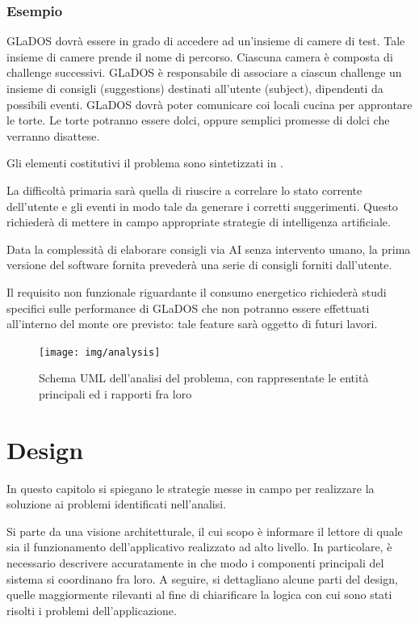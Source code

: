 \documentclass[a4paper,12pt]{report}
\begin{document}
\subsection*{Esempio}
GLaDOS dovrà essere in grado di accedere ad un'insieme di camere di test.
%
Tale insieme di camere prende il nome di percorso.
%
Ciascuna camera è composta di challenge successivi.
%
GLaDOS è responsabile di associare a ciascun challenge un insieme di consigli (suggestions) destinati all'utente (subject), dipendenti da possibili eventi.
%
GLaDOS dovrà poter comunicare coi locali cucina per approntare le torte.
%
Le torte potranno essere dolci, oppure semplici promesse di dolci che verranno disattese.

Gli elementi costitutivi il problema sono sintetizzati in .

La difficoltà primaria sarà quella di riuscire a correlare lo stato corrente dell'utente e gli eventi in modo tale da generare i corretti suggerimenti.
%
Questo richiederà di mettere in campo appropriate strategie di intelligenza artificiale.

Data la complessità di elaborare consigli via AI senza intervento umano, la prima versione del software fornita prevederà una serie di consigli forniti dall'utente.

Il requisito non funzionale riguardante il consumo energetico richiederà studi specifici sulle performance di GLaDOS che non potranno essere effettuati all'interno del monte ore previsto: tale feature sarà oggetto di futuri lavori.

\begin{figure}
\centering{}
\texttt{[image: img/analysis]}
\caption{Schema UML dell'analisi del problema, con rappresentate le entità principali ed i rapporti fra loro}
\label{img:analysis}
\end{figure}

\chapter{Design}

In questo capitolo si spiegano le strategie messe in campo per realizzare la soluzione ai problemi identificati nell'analisi.

Si parte da una visione architetturale, il cui scopo è informare il lettore di quale sia il funzionamento dell'applicativo realizzato ad alto livello.
%
In particolare, è necessario descrivere accuratamente in che modo i componenti principali del sistema si coordinano fra loro.
%
A seguire, si dettagliano alcune parti del design, quelle maggiormente rilevanti al fine di chiarificare la logica con cui sono stati risolti i problemi dell'applicazione.
\end{document}
